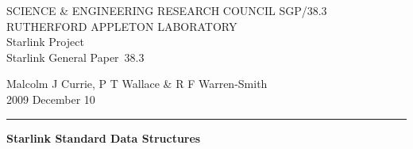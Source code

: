 \documentclass[twoside,11pt]{article}
\newcommand{\stardoccategory}  {Starlink General Paper}
\newcommand{\stardocinitials}  {SGP}
\newcommand{\stardocnumber}    {38.3}
\newcommand{\stardocauthors}   {Malcolm J Currie, P T Wallace \&
                                R F Warren-Smith}
\newcommand{\stardocdate}      {2009 December 10}
\newcommand{\stardoctitle}     {Starlink Standard Data Structures}
\newcommand{\stardocname}{\stardocinitials /\stardocnumber}
\newenvironment{latexonly}{}{}
\renewcommand{\_}{\texttt{\symbol{95}}}
\begin{document}
\thispagestyle{empty}

\begin{latexonly}
   SCIENCE \& ENGINEERING RESEARCH COUNCIL \hfill \stardocname\\
   RUTHERFORD APPLETON LABORATORY\\
   {\large Starlink Project\\}
   {\large \stardoccategory\ \stardocnumber}
   \begin{flushright}
   \stardocauthors\\
   \stardocdate
   \end{flushright}
   \vspace{-4mm}
   \rule{\textwidth}{0.5mm}
   \vspace{5mm}
   \begin{center}
   {\Large\bf \stardoctitle}
   \end{center}
   \vspace{5mm}

\end{latexonly}
\end{document}
